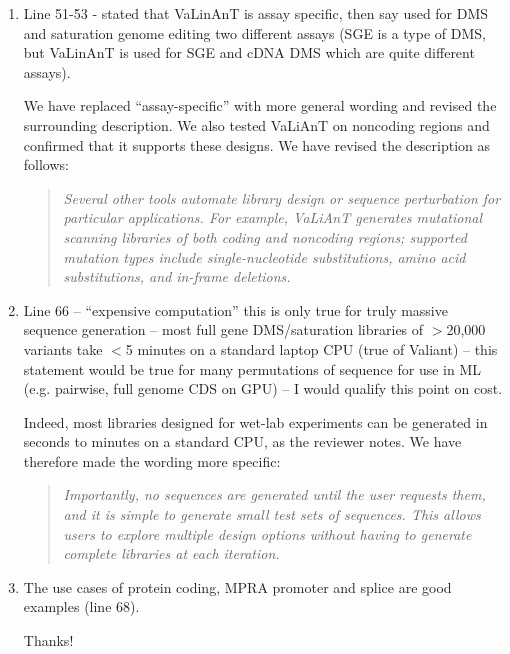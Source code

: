 \documentclass[11pt]{article}
\newenvironment{response}{\par\color{responseblue}}{\par}
\newenvironment{msquote}
  {\begin{quote}\color{responseblue}\itshape\noindent\ignorespaces}
  {\end{quote}}
\begin{document}
\begin{enumerate}
\item Line 51-53 - stated that VaLinAnT is assay specific, then say used for DMS
and saturation genome editing two different assays (SGE is a type of DMS, but
VaLinAnT is used for SGE and cDNA DMS which are quite different assays).

\begin{response}
We have replaced ``assay-specific'' with more general wording and revised the surrounding description. We also tested VaLiAnT on noncoding regions and confirmed that it supports these designs. We have revised the description as follows:
\end{response}

\begin{msquote}
Several other tools automate library design or sequence perturbation for particular applications. For example, VaLiAnT \citep{Barbon2022th} generates mutational scanning libraries of both coding and noncoding regions; supported mutation types include single-nucleotide substitutions, amino acid substitutions, and in-frame deletions.
\end{msquote}

\item Line 66 -- ``expensive computation'' this is only true for truly massive
sequence generation -- most full gene DMS/saturation libraries of $>$20,000
variants take $<$5 minutes on a standard laptop CPU (true of Valiant) -- this
statement would be true for many permutations of sequence for use in ML (e.g.
pairwise, full genome CDS on GPU) -- I would qualify this point on cost.

\begin{response}
Indeed, most libraries designed for wet-lab experiments can be generated in seconds to minutes on a standard CPU, as the reviewer notes. We have therefore made the wording more specific:
\end{response}

\begin{msquote}
Importantly, no sequences are generated until the user requests them, and it is simple to generate small test sets of sequences. This allows users to explore multiple design options without having to generate complete libraries at each iteration.
\end{msquote}

\item The use cases of protein coding, MPRA promoter and splice are good examples
(line 68).

\begin{response}
Thanks!
\end{response}


\end{enumerate}
\end{document}
